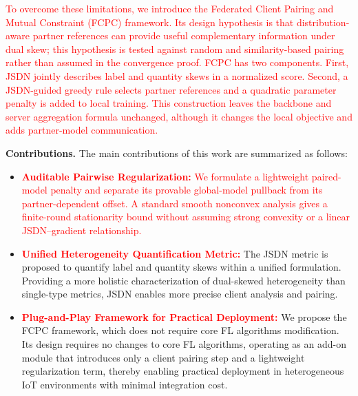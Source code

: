\documentclass[journal,twoside,web]{ieeecolor}
\newcommand{\rev}[1]{\textcolor{red}{#1}}
\begin{document}

\rev{To overcome these limitations, we introduce the Federated Client Pairing and Mutual Constraint (FCPC) framework. Its design hypothesis is that distribution-aware partner references can provide useful complementary information under dual skew; this hypothesis is tested against random and similarity-based pairing rather than assumed in the convergence proof. FCPC has two components. First, JSDN jointly describes label and quantity skews in a normalized score. Second, a JSDN-guided greedy rule selects partner references and a quadratic parameter penalty is added to local training. This construction leaves the backbone and server aggregation formula unchanged, although it changes the local objective and adds partner-model communication.}



\textbf{Contributions.} The main contributions of this work are summarized as follows:

\begin{itemize}
      \item \textbf{\rev{Auditable Pairwise Regularization:}} \rev{We formulate a lightweight paired-model penalty and separate its provable global-model pullback from its partner-dependent offset. A standard smooth nonconvex analysis gives a finite-round stationarity bound without assuming strong convexity or a linear JSDN--gradient relationship.}

    \item \textbf{\rev{Unified Heterogeneity Quantification Metric:}} The JSDN metric is proposed to quantify label and quantity skews within a unified formulation. Providing a more holistic characterization of dual-skewed heterogeneity than single-type metrics, JSDN enables more precise client analysis and pairing.

    \item \textbf{\rev{Plug-and-Play Framework for Practical Deployment:}} We propose the FCPC framework, which does not require core FL algorithms modification. Its design requires no changes to core FL algorithms, operating as an add-on module that introduces only a client pairing step and a lightweight regularization term, thereby enabling practical deployment in heterogeneous IoT environments with minimal integration cost.
    
\end{itemize}
\end{document}
